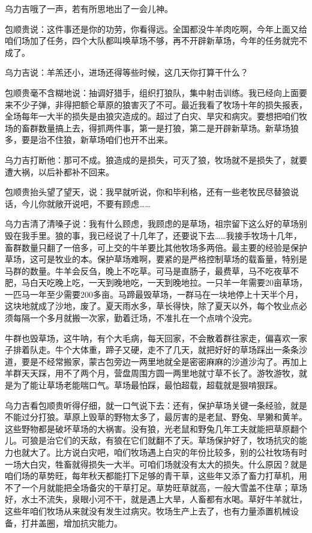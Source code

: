 \par 乌力吉哦了一声，若有所思地出了一会儿神。
\par 包顺贵说：这件事还是你的功劳，你看得远。全国都没牛羊肉吃啊，今年上面又给咱们场加了任务，四个大队都叫唤草场不够，再不开辟新草场，今年的任务就完不成了。
\par 乌力吉说：羊羔还小，进场还得等些时候，这几天你打算干什么？
\par 包顺贵毫不含糊地说：抽调好猎手，组织打狼队，集中射击训练。我已经向上面要来不少子弹，非得把额仑草原的狼害灭了不可。最近我看了牧场十年的损失报表，全场每年一大半的损失是由狼灾造成的。超过了白灾、旱灾和病灾。要想把咱们牧场的畜群数量搞上去，得抓两件事，第一是打狼，第二是开辟新草场。新草场狼多，要是治不住狼，新草场咱们也开不出来。
\par 乌力吉打断他：那可不成。狼造成的是损失，可灭了狼，牧场就不是损失了，就要遭大祸，以后补都补不回来。
\par 包顺贵抬头望了望天，说：我早就听说，你和毕利格，还有一些老牧民尽替狼说话，今儿你就敞开说吧，不要有顾虑……
\par 乌力吉清了清嗓子说：我有什么顾虑，我顾虑的是草场，祖宗留下这么好的草场别毁在我手里。狼的事，我已经说了十几年了，还要说下去……我接手牧场十几年，畜群数量只翻了一倍多，可上交的牛羊要比其他牧场多两倍。最主要的经验是保护草场，这可是牧业的本。保护草场难啊，要紧的是严格控制草场的载畜量，特别是马群的数量。牛羊会反刍，晚上不吃草。可马是直肠子，最费草，马不吃夜草不肥，马白天吃晚上吃，一天到晚地吃，一天到晚地拉。一只羊一年需要20亩草场，一匹马一年至少需要200多亩。马蹄最毁草场，一群马在一块地停上十天半个月，这块地就成了沙地，废了。夏天雨水多，草长得快，除了夏天以外，每个牧业点必须每隔一个多月就搬一次家，勤着迁场，不准扎在一个点啃个没完。
\par 牛群也毁草场，这牛呐，有个大毛病，每天回家，不会散着群往家走，偏喜欢一家子排着队走。牛个大体重，蹄子又硬，走不了几天，就把好好的草场踩出一条条沙道，要是不经常搬家，蒙古包旁边一两里地就全是密密麻麻的沙道沙沟了。再加上羊群天天踩，用不了两个月，营盘周围方圆一两里地就寸草不长了。游牧游牧，就是为了能让草场老能喘口气。草场最怕踩，最怕超载，超载就是狠啃狠踩。
\par 乌力吉看包顺贵听得仔细，就一口气说下去：还有，保护草场关键一条经验，就是不能过分打狼。草原上毁草的野物太多了，最厉害的是老鼠、野兔、旱獭和黄羊。这些野物都是破坏草场的大祸害。没有狼，光老鼠和野兔几年工夫就能把草原翻个儿。可狼是治它们的天敌，有狼在它们就翻不了天。草场保护好了，牧场抗灾的能力也就大了。比方说白灾吧，咱们牧场遇上白灾的年份比较多，别的公社牧场有时一场大白灾，牲畜就得损失一大半。可咱们场就没有太大的损失。什么原因？就是咱们场的草势旺，每年秋天都能打下足够的青干草，这些年又添了畜力打草机，用不了一个月就能把全场备灾的干草打足。草势旺草就高，一般大雪盖不住草；草场好，水土不流失，泉眼小河不干，就是遇上大旱，人畜都有水喝。草好牛羊就壮，这些年咱们牧场从来就没有发生过病灾。牧场生产上去了，也有力量添置机械设备，打井盖圈，增加抗灾能力。
